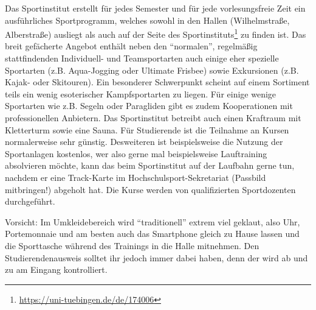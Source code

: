 
Das Sportinstitut erstellt für jedes Semester und für jede
  vorlesungsfreie Zeit ein ausführliches Sportprogramm, welches sowohl in
  den Hallen (Wilhelmstraße, Alberstraße) ausliegt als auch auf der
  Seite des Sportinstituts\footnote{
  \url{https://uni-tuebingen.de/de/174006}}
  zu finden ist. Das breit gefächerte Angebot enthält neben den "`normalen"', regelmäßig stattfindenden Individuell- und Teamsportarten auch einige eher spezielle Sportarten (z.B. Aqua-Jogging oder Ultimate Frisbee) sowie Exkursionen (z.B. Kajak- oder Skitouren). Ein besonderer Schwerpunkt scheint auf einem Sortiment teils ein wenig esoterischer Kampfsportarten zu liegen. Für einige wenige Sportarten wie z.B. Segeln oder Paragliden gibt es zudem Kooperationen mit professionellen Anbietern. Das Sportinstitut betreibt auch einen Kraftraum mit Kletterturm sowie eine Sauna. Für Studierende ist
  die Teilnahme an Kursen normalerweise sehr günstig. 
  Desweiteren ist beispielsweise die Nutzung der Sportanlagen kostenlos, wer also gerne mal beispielsweise Lauftraining absolvieren möchte, kann das beim Sportinstitut auf der Laufbahn gerne tun, nachdem er eine Track-Karte im Hochschulsport-Sekretariat (Passbild mitbringen!) abgeholt hat.
  Die Kurse werden von qualifizierten Sportdozenten durch\-ge\-führt.\medskip

Vorsicht: Im Umkleidebereich wird "`traditionell"' extrem viel
  geklaut, also Uhr, Portemonnaie und am besten auch das Smartphone gleich
  zu Hause lassen und die Sporttasche wäh\-rend des Trainings in
  die Halle mitnehmen. Den Studierendenausweis solltet ihr jedoch immer dabei haben, denn der wird
  ab und zu am Eingang kontrolliert.
